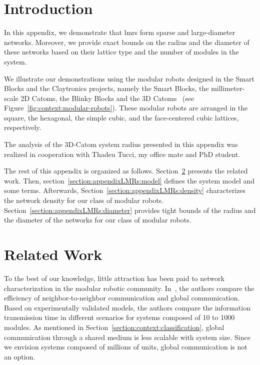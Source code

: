 \section{Introduction}

In this appendix, we demonstrate that \gls{lmrs} form sparse and large-diameter networks. Moreover, we provide exact bounds on the radius and the diameter of these networks based on their lattice type and the number of modules in the system.

We illustrate our demonstrations using the modular robots designed in the Smart Blocks and the Claytronics projects, namely the Smart Blocks, the millimeter-scale 2D Catoms, the Blinky Blocks and the 3D Catoms~\cite{piranda2016geom} (see Figure~\ref{fig:context:modular-robots}). These modular robots are arranged in the square, the hexagonal, the simple cubic, and the face-centered cubic lattices, respectively.

The analysis of the 3D-Catom system radius presented in this appendix was realized in cooperation with Thadeu Tucci, my office mate and PhD student.

The rest of this appendix is organized as follows. Section~\ref{section:appendixLMRs:related-work} presents the related work. Then, section~\ref{section:appendixLMRs:model} defines the system model and some terms. Afterwards, Section~\ref{section:appendixLMRs:density} characterizes the network density for our class of modular robots. Section~\ref{section:appendixLMRs:diameter} provides tight bounds of the radius and the diameter of the networks for our class of modular robots.

\section{Related Work}
\label{section:appendixLMRs:related-work}

To the best of our knowledge, little attraction has been paid to network characterization in the modular robotic community. In~\cite{garcia2009efficiency}, the authors compare the efficiency of neighbor-to-neighbor communication and global communication. Based on experimentally validated models, the authors compare the information transmission time in different scenarios for systems composed of 10 to 1000 modules. As mentioned in Section~\ref{section:context:classification}, global communication through a shared medium is less scalable with system size. Since we envision systems composed of millions of units, global communication is not an option.

